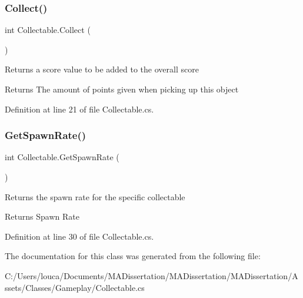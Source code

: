 \subsubsection{\texorpdfstring{Collect()}{Collect()}}
{\footnotesize\ttfamily int Collectable.\+Collect (\begin{DoxyParamCaption}{ }\end{DoxyParamCaption})}



Returns a score value to be added to the overall score 

\begin{DoxyReturn}{Returns}
The amount of points given when picking up this object
\end{DoxyReturn}


Definition at line 21 of file Collectable.\+cs.

\mbox{\label{class_collectable_a11287fc9a8dda57c70095d56f53aa329}} 
\subsubsection{\texorpdfstring{Get\+Spawn\+Rate()}{GetSpawnRate()}}
{\footnotesize\ttfamily int Collectable.\+Get\+Spawn\+Rate (\begin{DoxyParamCaption}{ }\end{DoxyParamCaption})}



Returns the spawn rate for the specific collectable 

\begin{DoxyReturn}{Returns}
Spawn Rate
\end{DoxyReturn}


Definition at line 30 of file Collectable.\+cs.



The documentation for this class was generated from the following file\+:\begin{DoxyCompactItemize}
\item 
C\+:/\+Users/louca/\+Documents/\+M\+A\+Dissertation/\+M\+A\+Dissertation/\+M\+A\+Dissertation/\+Assets/\+Classes/\+Gameplay/Collectable.\+cs\end{DoxyCompactItemize}
